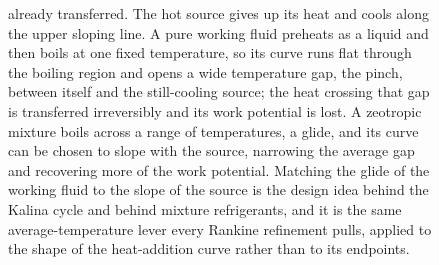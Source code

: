 \begin{figure}[htbp]
{already transferred. The hot source gives up its heat and cools along the upper
sloping line. A pure working fluid preheats as a liquid and then boils at one
fixed temperature, so its curve runs flat through the boiling region and opens a
wide temperature gap, the pinch, between itself and the still-cooling source; the
heat crossing that gap is transferred irreversibly and its work potential is
lost. A zeotropic mixture boils across a range of temperatures, a glide, and its
curve can be chosen to slope with the source, narrowing the average gap and
recovering more of the work potential. Matching the glide of the working fluid to
the slope of the source is the design idea behind the Kalina cycle and behind
mixture refrigerants, and it is the same average-temperature lever every Rankine
refinement pulls, applied to the shape of the heat-addition curve rather than to
its endpoints.}
\label{fig:vol04ch03:glide-matching}
\end{figure}
